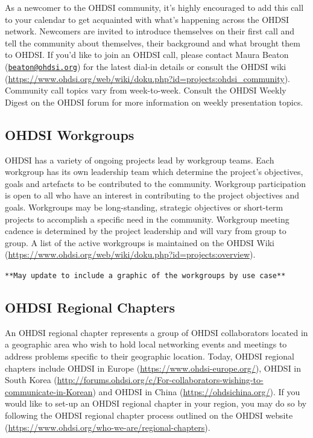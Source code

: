 \documentclass[11pt]{book}
\theoremstyle{definition}
\theoremstyle{definition}
\theoremstyle{definition}
\theoremstyle{remark}
\begin{document}
As a newcomer to the OHDSI community, it's highly encouraged to add this call to your calendar to get acquainted with what's happening across the OHDSI network. Newcomers are invited to introduce themselves on their first call and tell the community about themselves, their background and what brought them to OHDSI. If you'd like to join an OHDSI call, please contact Maura Beaton (\href{mailto:beaton@ohdsi.org}{\nolinkurl{beaton@ohdsi.org}}) for the latest dial-in details or consult the OHDSI wiki (\url{https://www.ohdsi.org/web/wiki/doku.php?id=projects:ohdsi_community}). Community call topics vary from week-to-week. Consult the OHDSI Weekly Digest on the OHDSI forum for more information on weekly presentation topics.

\hypertarget{ohdsi-workgroups}{%
\subsection{OHDSI Workgroups}\label{ohdsi-workgroups}}

OHDSI has a variety of ongoing projects lead by workgroup teams. Each workgroup has its own leadership team which determine the project's objectives, goals and artefacts to be contributed to the community. Workgroup participation is open to all who have an interest in contributing to the project objectives and goals. Workgroups may be long-standing, strategic objectives or short-term projects to accomplish a specific need in the community. Workgroup meeting cadence is determined by the project leadership and will vary from group to group. A list of the active workgroups is maintained on the OHDSI Wiki (\url{https://www.ohdsi.org/web/wiki/doku.php?id=projects:overview}).

\texttt{**May\ update\ to\ include\ a\ graphic\ of\ the\ workgroups\ by\ use\ case**}

\hypertarget{ohdsi-regional-chapters}{%
\subsection{OHDSI Regional Chapters}\label{ohdsi-regional-chapters}}

An OHDSI regional chapter represents a group of OHDSI collaborators located in a geographic area who wish to hold local networking events and meetings to address problems specific to their geographic location. Today, OHDSI regional chapters include OHDSI in Europe (\url{https://www.ohdsi-europe.org/}), OHDSI in South Korea (\url{http://forums.ohdsi.org/c/For-collaborators-wishing-to-communicate-in-Korean}) and OHDSI in China (\url{https://ohdsichina.org/}). If you would like to set-up an OHDSI regional chapter in your region, you may do so by following the OHDSI regional chapter process outlined on the OHDSI website (\url{https://www.ohdsi.org/who-we-are/regional-chapters}).
\end{document}
